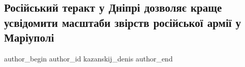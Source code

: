  
 
 
 
 

\subsection{Російський теракт у Дніпрі дозволяє краще усвідомити масштаби звірств російської армії у Маріуполі}
\label{sec:16_01_2023.fb.kazanskij_denis.1.ros_iskii_terakt_u_d}

\ifcmt
 author_begin
   author_id kazanskij_denis
 author_end
\fi
